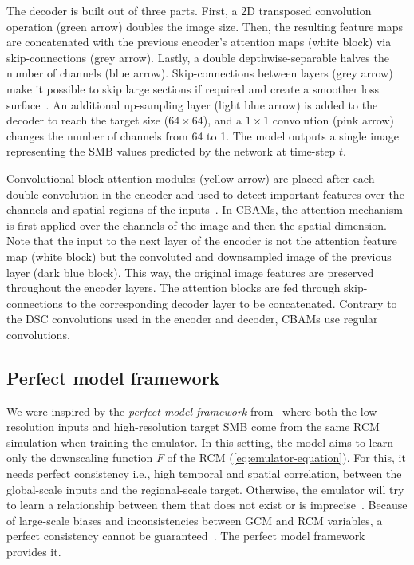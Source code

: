 \documentclass[a4paper,11pt,oneside]{report}
\begin{document}
The decoder is built out of three parts. First, a 2D transposed convolution operation (green arrow) doubles the image size. Then, the resulting feature maps are concatenated with the previous encoder's attention maps (white block) via skip-connections (grey arrow). Lastly, a double depthwise-separable halves the number of channels (blue arrow). Skip-connections between layers (grey arrow) make it possible to skip large sections if required and create a smoother loss surface~\cite{Li2017}. An additional up-sampling layer (light blue arrow) is added to the decoder to reach the target size ($64\times 64$), and a $1\times1$ convolution (pink arrow) changes the number of channels from 64 to 1. The model outputs a single image representing the SMB values predicted by the network at time-step $t$.

Convolutional block attention modules (yellow arrow) are placed after each double convolution in the encoder and used to detect important features over the channels and spatial regions of the inputs~\cite{smatunet}. In CBAMs, the attention mechanism is first applied over the channels of the image and then the spatial dimension. Note that the input to the next layer of the encoder is not the attention feature map (white block) but the convoluted and downsampled image of the previous layer (dark blue block). This way, the original image features are preserved throughout the encoder layers. The attention blocks are fed through skip-connections to the corresponding decoder layer to be concatenated. Contrary to the DSC convolutions used in the encoder and decoder, CBAMs use regular convolutions.  

\subsection{Perfect model framework}\label{subsec:perfect-model}

We were inspired by the \textit{perfect model framework} from~\cite{Doury} where both the low-resolution inputs and high-resolution target SMB come from the same RCM simulation when training the emulator. In this setting, the model aims to learn only the downscaling function $F$ of the RCM (\autoref{eq:emulator-equation}). For this, it needs perfect consistency i.e., high temporal and spatial correlation, between the global-scale inputs and the regional-scale target. Otherwise, the emulator will try to learn a relationship between them that does not exist or is imprecise~\cite{Doury}. Because of large-scale biases and inconsistencies between GCM and RCM variables, a perfect consistency cannot be guaranteed~\cite{Sanchez2009, Sanchez2018}. The perfect model framework provides it.
\end{document}
